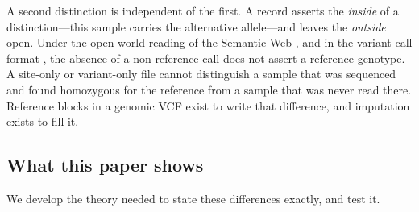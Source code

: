 \documentclass[11pt,twocolumn,a4paper]{article}
\theoremstyle{plain}
\theoremstyle{definition}
\theoremstyle{remark}
\begin{document}
A second distinction is independent of the first. A record asserts the
\emph{inside} of a distinction---this sample carries the alternative allele---and
leaves the \emph{outside} open. Under the open-world reading of the Semantic
Web \citep{rdf11,hogan2021}, and in the variant call format
\citep{danecek2011}, the absence of a non-reference call does not assert a
reference genotype. A site-only or variant-only file cannot distinguish a
sample that was sequenced and found homozygous for the reference from a sample
that was never read there. Reference blocks in a genomic VCF \citep{poplin2018}
exist to write that difference, and imputation exists to fill it.

\subsection{What this paper shows}

We develop the theory needed to state these differences exactly, and test it.
\end{document}
